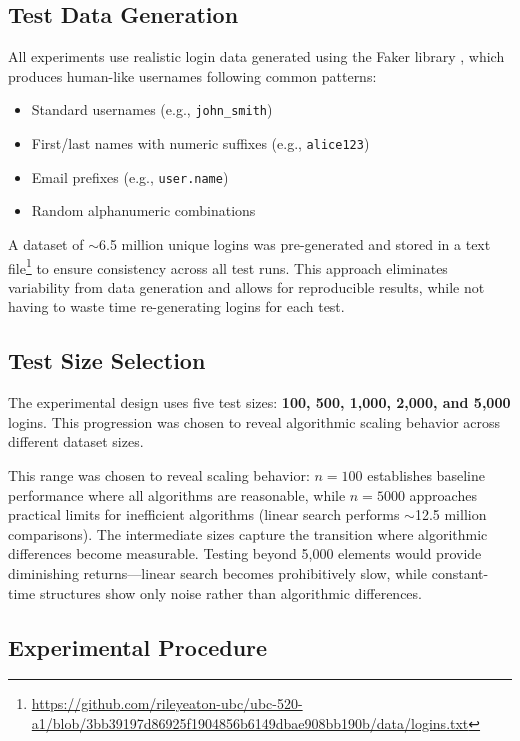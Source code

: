 \subsection{Test Data Generation}

All experiments use realistic login data generated using the Faker library \cite{faker2024}, which produces human-like usernames following common patterns:
\begin{itemize}
    \item Standard usernames (e.g., \texttt{john\_smith})
    \item First/last names with numeric suffixes (e.g., \texttt{alice123})
    \item Email prefixes (e.g., \texttt{user.name})
    \item Random alphanumeric combinations
\end{itemize}

A dataset of $\sim$6.5 million unique logins was pre-generated and stored in a text file\footnote{\url{https://github.com/rileyeaton-ubc/ubc-520-a1/blob/3bb39197d86925f1904856b6149dbae908bb190b/data/logins.txt}} to ensure consistency across all test runs. This approach eliminates variability from data generation and allows for reproducible results, while not having to waste time re-generating logins for each test.

\subsection{Test Size Selection}

The experimental design uses five test sizes: \textbf{100, 500, 1,000, 2,000, and 5,000} logins. This progression was chosen to reveal algorithmic scaling behavior across different dataset sizes.

This range was chosen to reveal scaling behavior: $n=100$ establishes baseline performance where all algorithms are reasonable, while $n=5000$ approaches practical limits for inefficient algorithms (linear search performs $\sim$12.5 million comparisons). The intermediate sizes capture the transition where algorithmic differences become measurable. Testing beyond 5,000 elements would provide diminishing returns---linear search becomes prohibitively slow, while constant-time structures show only noise rather than algorithmic differences.

\subsection{Experimental Procedure}

